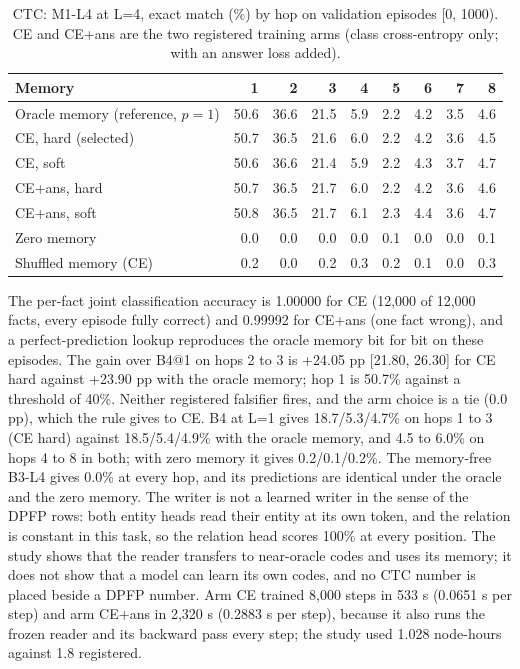 \begin{table}[htbp]
\centering\footnotesize
\caption{CTC: M1-L4 at L=4, exact match (\%) by hop on validation episodes [0, 1000).  %
CE and CE+ans are the two registered training arms (class cross-entropy only; with an answer loss added).}
\label{tab:i-ctc}
\begin{tabular}{@{}lrrrrrrrr@{}}
\toprule
Memory & 1 & 2 & 3 & 4 & 5 & 6 & 7 & 8 \\
\midrule
Oracle memory (reference, $p=1$) & 50.6 & 36.6 & 21.5 & 5.9 & 2.2 & 4.2 & 3.5 & 4.6 \\
CE, hard (selected) & 50.7 & 36.5 & 21.6 & 6.0 & 2.2 & 4.2 & 3.6 & 4.5 \\
CE, soft & 50.6 & 36.6 & 21.4 & 5.9 & 2.2 & 4.3 & 3.7 & 4.7 \\
CE+ans, hard & 50.7 & 36.5 & 21.7 & 6.0 & 2.2 & 4.2 & 3.6 & 4.6 \\
CE+ans, soft & 50.8 & 36.5 & 21.7 & 6.1 & 2.3 & 4.4 & 3.6 & 4.7 \\
Zero memory & 0.0 & 0.0 & 0.0 & 0.0 & 0.1 & 0.0 & 0.0 & 0.1 \\
Shuffled memory (CE) & 0.2 & 0.0 & 0.2 & 0.3 & 0.2 & 0.1 & 0.0 & 0.3 \\
\bottomrule
\end{tabular}
\end{table}

The per-fact joint classification accuracy is 1.00000 for CE (12,000 of 12,000 facts, every episode fully correct) and 0.99992 for CE+ans (one fact wrong), and a perfect-prediction lookup reproduces the oracle memory bit for bit on these episodes.  %
The gain over B4@1 on hops 2 to 3 is +24.05 pp [21.80, 26.30] for CE hard against +23.90 pp with the oracle memory; hop 1 is 50.7\% against a threshold of 40\%.
Neither registered falsifier fires, and the arm choice is a tie (0.0 pp), which the rule gives to CE.  %
B4 at L=1 gives 18.7/5.3/4.7\% on hops 1 to 3 (CE hard) against 18.5/5.4/4.9\% with the oracle memory, and 4.5 to 6.0\% on hops 4 to 8 in both; with zero memory it gives 0.2/0.1/0.2\%.
The memory-free B3-L4 gives 0.0\% at every hop, and its predictions are identical under the oracle and the zero memory.  %
The writer is not a learned writer in the sense of the DPFP rows: both entity heads read their entity at its own token, and the relation is constant in this task, so the relation head scores 100\% at every position.  %
The study shows that the reader transfers to near-oracle codes and uses its memory; it does not show that a model can learn its own codes, and no CTC number is placed beside a DPFP number.  %
Arm CE trained 8,000 steps in 533 s (0.0651 s per step) and arm CE+ans in 2,320 s (0.2883 s per step), because it also runs the frozen reader and its backward pass every step; the study used 1.028 node-hours against 1.8 registered.  %

